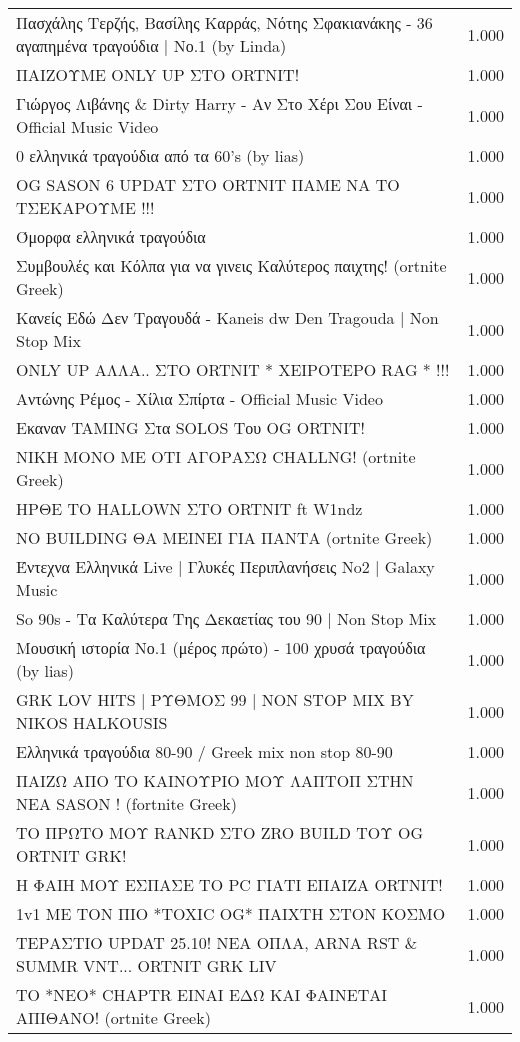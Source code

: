 \begin{table}
\begin{tabular}{|p{10cm}|p{1cm}|}
Πασχάλης Τερζής, Βασίλης Καρράς, Νότης Σφακιανάκης - 36 αγαπημένα τραγούδια | Νο.1 (by Linda) & 1.000 \\
ΠΑΙΖΟΥΜΕ ONLY UP ΣΤΟ ORTNIT! & 1.000 \\
Γιώργος Λιβάνης \& Dirty Harry - Αν Στο Χέρι Σου Είναι - Official Music Video & 1.000 \\
0 ελληνικά τραγούδια από τα 60's (by lias) & 1.000 \\
OG SASON 6 UPDAT ΣΤΟ ORTNIT ΠΑΜΕ ΝΑ ΤΟ ΤΣΕΚΑΡΟΥΜΕ !!! & 1.000 \\
Όμορφα ελληνικά τραγούδια & 1.000 \\
Συμβουλές και Κόλπα για να γινεις Καλύτερος παιχτης! (ortnite Greek) & 1.000 \\
Κανείς Εδώ Δεν Τραγουδά - Kaneis dw Den Tragouda | Non Stop Mix & 1.000 \\
ONLY UP ΑΛΛΑ.. ΣΤΟ ORTNIT * ΧΕΙΡΟΤΕΡΟ RAG * !!! & 1.000 \\
Αντώνης Ρέμος - Χίλια Σπίρτα - Official Music Video & 1.000 \\
Εκαναν TAMING Στα SOLOS Του OG ORTNIT! & 1.000 \\
ΝΙΚΗ ΜΟΝΟ ΜΕ ΟΤΙ ΑΓΟΡΑΣΩ CHALLNG! (ortnite Greek) & 1.000 \\
ΗΡΘΕ ΤΟ HALLOWN ΣΤΟ ORTNIT ft W1ndz & 1.000 \\
NO BUILDING ΘΑ ΜΕΙΝΕΙ ΓΙΑ ΠΑΝΤΑ (ortnite Greek) & 1.000 \\
Έντεχνα Ελληνικά Live | Γλυκές Περιπλανήσεις No2 | Galaxy Music & 1.000 \\
So 90s - Τα Καλύτερα Της Δεκαετίας του 90 | Non Stop Mix & 1.000 \\
Μουσική ιστορία Νο.1 (μέρος πρώτο) - 100 χρυσά τραγούδια (by lias) & 1.000 \\
GRK LOV HITS | ΡΥΘΜΟΣ 99 | NON STOP MIX BY NIKOS HALKOUSIS & 1.000 \\
Ελληνικά τραγούδια 80-90 / Greek mix non stop 80-90 & 1.000 \\
ΠΑΙΖΩ ΑΠΟ ΤΟ ΚΑΙΝΟΥΡΙΟ ΜΟΥ ΛΑΠΤΟΠ ΣΤΗΝ ΝΕΑ SASON ! (fortnite Greek) & 1.000 \\
ΤΟ ΠΡΩΤΟ ΜΟΥ RANKD ΣΤΟ ZRO BUILD ΤΟΥ OG ORTNIT GRK! & 1.000 \\
Η ΦΑΙΗ ΜΟΥ ΕΣΠΑΣΕ ΤΟ PC ΓΙΑΤΙ ΕΠΑΙΖΑ ORTNIT! & 1.000 \\
1v1 ΜΕ ΤΟΝ ΠΙΟ *TOXIC OG* ΠΑΙΧΤΗ ΣΤΟΝ ΚΟΣΜΟ & 1.000 \\
 ΤΕΡΑΣΤΙΟ UPDAT 25.10!  ΝΕΑ ΟΠΛΑ, ARNA RST \& SUMMR VNT...  ORTNIT GRK LIV & 1.000 \\
ΤΟ *ΝΕΟ* CHAPTR  ΕΙΝΑΙ ΕΔΩ ΚΑΙ ΦΑΙΝΕΤΑΙ ΑΠΙΘΑΝΟ! (ortnite Greek) & 1.000 \\

\end{tabular}
\end{table}
